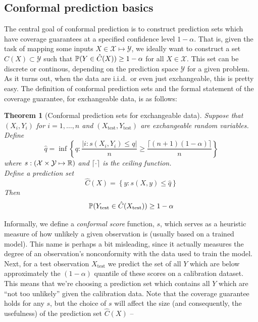 \documentclass[a4paper, 12pt]{article}
\newtheorem{theorem}{Theorem}
\begin{document}
\subsection{Conformal prediction basics}
\label{sec:basics}
The central goal of conformal prediction is to construct prediction sets which have coverage guarantees at
a specified confidence level $1-\alpha$. That is, given the task of mapping some inputs
$X \in \mathcal{X} \mapsto \mathcal{Y}$, we ideally want to construct a set $\hat{C}(X) \subset \mathcal{Y}$ such that
$\P(Y \in \hat{C}(X)) \geq 1 - \alpha$ for all $X \in \mathcal{X}$. This set can be discrete or continous, depending on the prediction space $\mathcal{Y}$ for a given problem. As it turns out,
when the data are i.i.d.\ or even just exchangeable, this is pretty easy. The definition of conformal prediction sets and the formal statement of the coverage
guarantee, for exchangeable data, is as follows:
\begin{theorem}[Conformal prediction sets for exchangeable data]
    Suppose that $(X_i, Y_i)$ for $i = 1, \ldots, n$ and $(X_{\text{test}}, Y_{\text{test}})$ are exchangeable random variables. \\
    Define
    \[
        \hat{q} = \inf \left\{ q: \frac{\left| i : s(X_i, Y_i) \leq q \right|}{n} \geq \frac{\lceil (n+1)(1-\alpha) \rceil }{n} \right\}
    \]
    where $s : (\mathcal{X} \times \mathcal{Y} \mapsto \R) $ and $\lceil \cdot \rceil$ is the ceiling function.\\
    Define a prediction set
    \[
        \hat{C}(X) = \left\{ y: s(X, y) \leq \hat{q} \right\}
    \]
    Then \[ \P (Y_{\text{test}} \in \hat{C}(X_{\text{test}})) \geq 1 - \alpha \]
    \label{thm:exchangeable_conformal_prediction}
\end{theorem}
Informally, we define a \textit{conformal score} function, $s$, which serves as a heuristic measure of how unlikely a given observation is (usually based on a trained model). This name is perhaps a bit misleading, since it actually measures the degree of an observation's nonconformity with the data used to train the model.
Next, for a test observation $X_{\text{test}}$ we predict the set of all $Y$ which are below approximately the $(1-\alpha)$ quantile of these scores on a calibration dataset.
This means that we're choosing a prediction set which contains all $Y$ which are ``not too unlikely'' given the calibration data.
Note that the coverage guarantee holds for any $s$, but the choice of $s$ will affect the size (and consequently, the usefulness) of the prediction set $\hat{C}(X)$ --\
\end{document}
